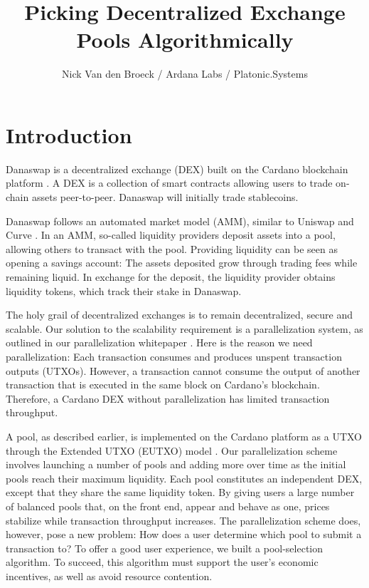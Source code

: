 \documentclass[12pt]{article}
\title{Picking Decentralized Exchange Pools Algorithmically}
\author{Nick Van den Broeck / Ardana Labs / Platonic.Systems}
\begin{document}
\maketitle

\section{Introduction}

Danaswap is a decentralized exchange (DEX) built on the Cardano blockchain
platform \cite{danaswap}.
A DEX is a collection of smart contracts allowing users to trade on-chain assets
peer-to-peer.
Danaswap will initially trade stablecoins.

Danaswap follows an automated market model (AMM), similar to Uniswap
\cite{uniswap, uniswap2, uniswap3} and Curve \cite{curvecrypto, stableswap}.
In an AMM, so-called liquidity providers deposit assets into a pool, allowing
others to transact with the pool.
Providing liquidity can be seen as opening a savings account:
The assets deposited grow through trading fees while remaining liquid.
In exchange for the deposit, the liquidity provider obtains liquidity tokens,
which track their stake in Danaswap.

The holy grail of decentralized exchanges is to remain decentralized, secure and
scalable.
Our solution to the scalability requirement is a parallelization system, as
outlined in our parallelization whitepaper \cite{parallelism}.
Here is the reason we need parallelization:
Each transaction consumes and produces unspent transaction outputs (UTXOs).
However, a transaction cannot consume the output of another transaction that is
executed in the same block on Cardano's blockchain.
Therefore, a Cardano DEX without parallelization has limited transaction
throughput.

A pool, as described earlier, is implemented on the Cardano platform as a UTXO
through the Extended UTXO (EUTXO) model \cite{eutxo}. Our parallelization scheme involves launching a number of pools and adding more
over time as the initial pools reach their maximum liquidity.
Each pool constitutes an independent DEX, except that they share the same liquidity
token. By giving users a large number of balanced pools that, on the front end, appear and behave as one, prices stabilize while transaction throughput increases.  
The parallelization scheme does, however, pose a new problem:
How does a user determine which pool to submit a transaction to?
To offer a good user experience, we built a pool-selection algorithm.
To succeed, this algorithm must support the user's economic incentives, as well as
avoid resource contention.
\end{document}
